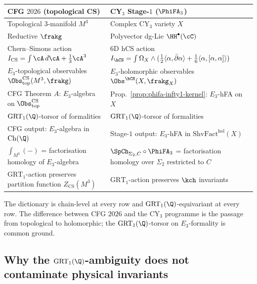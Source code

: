 \begin{remark}
\label{rem:cfg-dictionary-cy3}
\begin{center}
\begin{tabular}{ll}
\toprule
CFG $2026$ (topological CS) & CY$_3$ Stage-$1$ ($\PhiFA_3$) \\
\midrule
Topological $3$-manifold $M^3$ & Complex CY$_3$ variety $X$ \\
Reductive $\frakg$ & Polyvector dg-Lie $\HH^\bullet(\cC)$ \\
Chern--Simons action $I_{\mathrm{CS}} = \int \cA \, d\cA + \tfrac{1}{3}\cA^3$ & 6D hCS action $I_{\hCS} = \int \Omega_X \wedge (\tfrac{1}{2} \langle \alpha, \bar\partial\alpha\rangle + \tfrac{1}{6}\langle \alpha, [\alpha, \alpha]\rangle)$ \\
$E_3$-topological observables $\Obs^{\mathrm{CS}}_{\mathrm{top}}(M^3, \frakg)$ & $E_3$-holomorphic observables $\Obs^{\hCS}(X, \frakg_X)$ \\
CFG Theorem $A$: $E_3$-algebra on $\Obs^{\mathrm{CS}}_{\mathrm{top}}$ & Prop.~\ref{prop:phifa-infty1-kernel}: $E_3$-hFA on $X$ \\
$\mathrm{GRT}_1(\Q)$-torsor of formalities & $\mathrm{GRT}_1(\Q)$-torsor of formalities \\
CFG output: $E_3$-algebra in $\mathrm{Ch}(\Q)$ & Stage-$1$ output: $E_3$-hFA in $\mathrm{ShvFact}^{\mathrm{hol}}(X)$ \\
$\int_{M^3}(-)$ = factorisation homology of $E_3$-algebra & $\SpCh_{\Sigma_2, C} \circ \PhiFA_3$ = factorisation homology over $\Sigma_2$ restricted to $C$ \\
$\mathrm{GRT}_1$-action preserves partition function $Z_{\mathrm{CS}}(M^3)$ & $\mathrm{GRT}_1$-action preserves $\kch$ invariants \\
\bottomrule
\end{tabular}
\end{center}
The dictionary is chain-level at every row and $\mathrm{GRT}_1(\Q)$-equivariant
at every row. The difference between CFG $2026$ and the CY$_3$ programme
is the passage from topological to holomorphic; the $\mathrm{GRT}_1(\Q)$-torsor
on $E_3$-formality is common ground.
\end{remark}

\subsection*{Why the $\mathrm{GRT}_1(\Q)$-ambiguity does not contaminate physical invariants}

